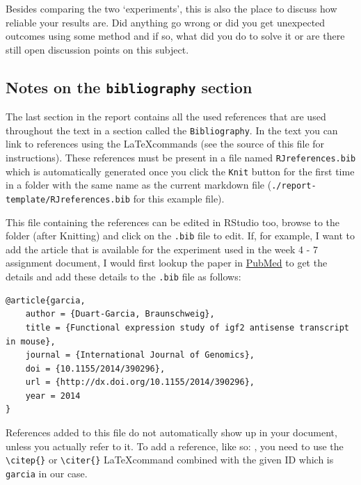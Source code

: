 Besides comparing the two `experiments', this is also the place to
discuss how reliable your results are. Did anything go wrong or did you
get unexpected outcomes using some method and if so, what did you do to
solve it or are there still open discussion points on this subject.

\hypertarget{notes-on-the-bibliography-section}{%
\subsection{\texorpdfstring{Notes on the \texttt{bibliography}
section}{Notes on the bibliography section}}\label{notes-on-the-bibliography-section}}

The last section in the report contains all the used references that are
used throughout the text in a section called the \texttt{Bibliography}.
In the text you can link to references using the \LaTeX commands (see
the source of this file for instructions). These references must be
present in a file named \texttt{RJreferences.bib} which is automatically
generated once you click the \texttt{Knit} button for the first time in
a folder with the same name as the current markdown file
(\texttt{./report-template/RJreferences.bib} for this example file).

This file containing the references can be edited in RStudio too, browse
to the folder (after Knitting) and click on the \texttt{.bib} file to
edit. If, for example, I want to add the article that is available for
the experiment used in the week 4 - 7 assignment document, I would first
lookup the paper in
\href{http://www.ncbi.nlm.nih.gov/pmc/articles/PMC3914337/}{PubMed} to
get the details and add these details to the \texttt{.bib} file as
follows:

\begin{verbatim}
@article{garcia,
    author = {Duart-Garcia, Braunschweig},
    title = {Functional expression study of igf2 antisense transcript in mouse},
    journal = {International Journal of Genomics},
    doi = {10.1155/2014/390296},
    url = {http://dx.doi.org/10.1155/2014/390296},
    year = 2014
}
\end{verbatim}

References added to this file do not automatically show up in your
document, unless you actually refer to it. To add a reference, like so:
\citep{garcia:2014}, you need to use the
\texttt{\textbackslash{}citep\{\}} or \texttt{\textbackslash{}citer\{\}}
\LaTeX command combined with the given ID which is \texttt{garcia} in
our case.




\address{%
Diemer Harbers\\
Hanze University of Applied Sciences\\%
Zernikeplein 11\\
%
%
%
\\\ldots{}\citet{st.hanze.nl}
}

\address{%
Douwe Metselaar\\
Hanze University of Applied Sciences\\%
Zernikeplein 11\\
%
%
%
\\\href{mailto:d.g.metselaar@st.hanze.nl}{\nolinkurl{d.g.metselaar@st.hanze.nl}}
}
